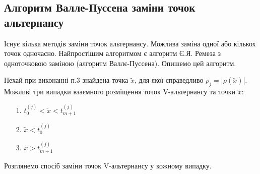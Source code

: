 \documentclass[ukrainian,14pt]{extarticle}
\begin{document}
\subsection{Алгоритм Валле-Пуссена заміни точок альтернансу}

Існує кілька методів заміни точок альтернансу. Можлива заміна одної або кількох точок одночасно. Найпростішим алгоритмом є алгоритм Є.Я. Ремеза з одноточковою заміною (алгоритм Валлє-Пуссена). Опишемо цей алгоритм.

Нехай при виконанні п.3 знайдена точка $\tilde{x}$, для якої справедливо $\rho_j = |\rho(\tilde{x})|$. Можливі три випадки взаємного розміщення точок V-альтернансу та точки $\tilde{x}$:
	\begin{enumerate}
		\item[1.] $t^{(j)}_0 < \tilde{x} < t^{(j)}_{m+1} $
		\item[2.] $\tilde{x} < t^{(j)}_{0}$
		\item[3.] $\tilde{x} > t^{(j)}_{m+1}$
	\end{enumerate}
	
	Розглянемо спосіб заміни точок V-альтернансу у кожному випадку.
	
\end{document}
